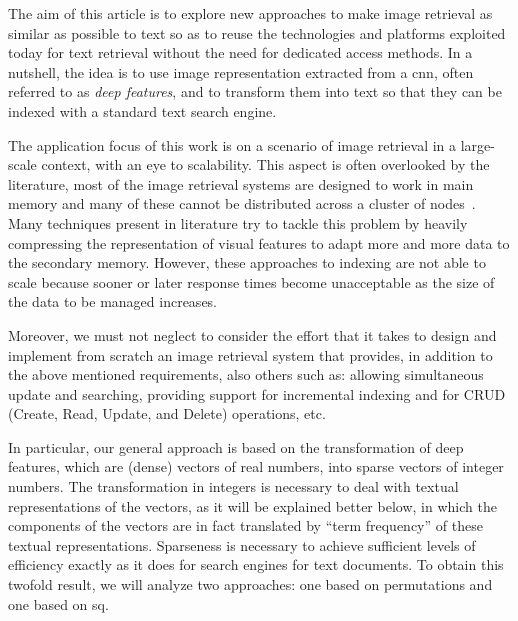 The aim of this article is to explore new approaches to make image retrieval as similar as possible to text so as to reuse the technologies and platforms exploited today for text retrieval without the need for dedicated access methods.
In a nutshell, the idea is to use image representation extracted from a \gls{cnn}, often referred to as \emph{deep features}, and to transform them into text so that they can be indexed with a standard text search engine.

The application focus of this work is on a scenario of image retrieval in a large-scale context, with an eye to scalability.
This aspect is often overlooked by the literature, most of the image retrieval systems are designed to work in main memory and many of these cannot be distributed across a cluster of nodes~\cite{navarro2016new}.
Many techniques present in literature try to tackle this problem by heavily compressing the representation of visual features to adapt more and more data to the secondary memory.
However, these approaches to indexing are not able to scale because sooner or later response times become unacceptable as the size of the data to be managed increases.

Moreover, we must not neglect to consider the effort that it takes to design and implement from scratch an image retrieval system that provides, in addition to the above mentioned requirements, also others such as: allowing simultaneous update and searching, providing support for incremental indexing and for CRUD (Create, Read, Update, and Delete) operations, etc.

In particular, our general approach is based on the transformation of deep features, which are (dense) vectors of real numbers, into sparse vectors of integer numbers.
The transformation in integers is necessary to deal with textual representations of the vectors, as it will be explained better below, in which the components of the vectors are in fact translated by ``term frequency'' of these textual representations.
Sparseness is necessary to achieve sufficient levels of efficiency exactly as it does for search engines for text documents.
To obtain this twofold result, we will analyze two approaches: one based on permutations and one based on \acrfull{sq}.

